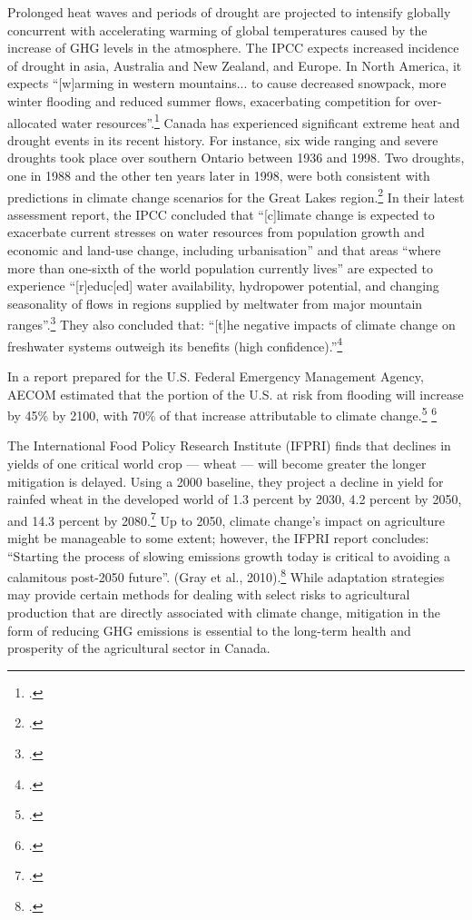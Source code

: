 Prolonged heat waves and periods of drought are projected to intensify globally concurrent with accelerating warming of global temperatures caused by the increase of GHG levels in the atmosphere.
The IPCC expects increased incidence of drought in asia, Australia and New Zealand, and Europe.
In North America, it expects ``[w]arming in western mountains... to cause decreased snowpack, more winter flooding and reduced summer flows, exacerbating competition for over-allocated water resources''.\footcite[][See: Synthesis report, Table SPM.2. Examples of some projected regional impacts. \url{https://www.ipcc.ch/publications_and_data/ar4/syr/en/spms3.html}]{IPCC2007}
Canada has experienced significant extreme heat and drought events in its recent history. 
For instance, six wide ranging and severe droughts took place over southern Ontario between 1936 and 1998. 
Two droughts, one in 1988 and the other ten years later in 1998, were both consistent with predictions in climate change scenarios for the Great Lakes region.\footcite[][]{Koshida2005}
In their latest assessment report, the IPCC concluded that ``[c]limate change is expected to exacerbate current stresses on water resources from population growth and economic and land-use change, including urbanisation'' and that areas ``where more than one-sixth of the world population currently lives'' are expected to experience ``[r]educ[ed] water availability, hydropower potential, and changing seasonality of flows in regions supplied by meltwater from major mountain ranges''.\footcite[][p. 49]{IPCCar4_syr}
They also concluded that: ``[t]he negative impacts of climate change on freshwater systems outweigh its benefits (high confidence).''\footcite[][p. 49]{IPCCar4_syr}



In a report prepared for the U.S. Federal Emergency Management Agency, AECOM estimated that the portion of the U.S. at risk from flooding will increase by 45\% by 2100, with 70\% of that increase attributable to climate change.\footcite[][p. ES-7]{FEMAFlood} \footcite[See also: ][]{MJFlood}



The International Food Policy Research Institute (IFPRI) finds that declines in yields of one critical world crop --- wheat --- will become greater the longer mitigation is delayed. 
Using a 2000 baseline, they project a decline in yield for rainfed wheat in the developed world of 1.3 percent by 2030, 4.2 percent by 2050, and 14.3 percent by 2080.\footcite[][p. 85]{Farming2050}
Up to 2050, climate change's impact on agriculture might be manageable to some extent; however, the IFPRI report concludes: ``Starting the process of slowing emissions growth today is critical to avoiding a calamitous post-2050 future''. (Gray et al., 2010).\footcite[][p. 86]{Farming2050}
While adaptation strategies may provide certain methods for dealing with select risks to agricultural production that are directly associated with climate change, mitigation in the form of reducing GHG emissions is essential to the long-term health and prosperity of the agricultural sector in Canada.



